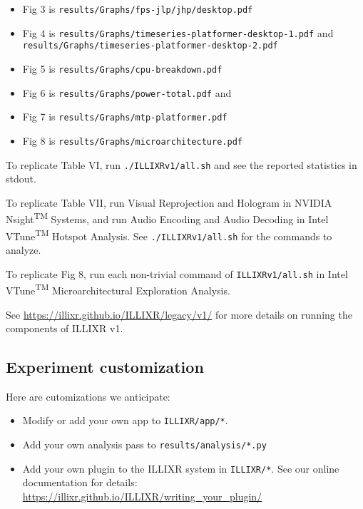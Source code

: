 \documentclass{sigplanconf}
\begin{document}
\begin{itemize}
\item Fig 3 is {\footnotesize\texttt{results/Graphs/fps-jlp/jhp/desktop.pdf}}
\item Fig 4 is {\footnotesize\texttt{results/Graphs/timeseries-platformer-desktop-1.pdf}} and {\footnotesize\texttt{results/Graphs/timeseries-platformer-desktop-2.pdf}}
\item Fig 5 is {\footnotesize\texttt{results/Graphs/cpu-breakdown.pdf}}
\item Fig 6 is {\footnotesize\texttt{results/Graphs/power-total.pdf}} and
\item Fig 7 is {\footnotesize\texttt{results/Graphs/mtp-platformer.pdf}}
\item Fig 8 is {\footnotesize\texttt{results/Graphs/microarchitecture.pdf}}
\end{itemize}

To replicate Table VI, run \texttt{./ILLIXRv1/all.sh} and see the reported statistics in stdout.

To replicate Table VII, run Visual Reprojection and Hologram in NVIDIA\textsuperscript{\textcopyright} Nsight\textsuperscript{TM} Systems, and run Audio Encoding and Audio Decoding in Intel\textsuperscript{\textcopyright} VTune\textsuperscript{TM} Hotspot Analysis. See \texttt{./ILLIXRv1/all.sh} for the commands to analyze.

To replicate Fig 8, run each non-trivial command of \texttt{ILLIXRv1/all.sh} in Intel\textsuperscript{\textcopyright} VTune\textsuperscript{TM} Microarchitectural Exploration Analysis.

See \url{https://illixr.github.io/ILLIXR/legacy/v1/} for more details on running the components of ILLIXR v1.

\subsection{Experiment customization}

Here are cutomizations we anticipate:

\begin{itemize}
\item Modify or add your own app to \texttt{ILLIXR/app/*}.
\item Add your own analysis pass to \texttt{results/analysis/*.py}
\item Add your own plugin to the ILLIXR system in \texttt{ILLIXR/*}. See our online documentation for details:\newline
{\footnotesize \url{https://illixr.github.io/ILLIXR/writing_your_plugin/}}
\end{itemize}
\end{document}

